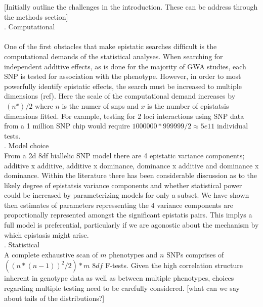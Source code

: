 \documentclass{article}
\begin{document}
[Initially outline the challenges in the introduction. These can be address through the methods section] \\
. Computational \\ 
 \\
\newline
One of the first obstacles that make epistatic searches difﬁcult is the computational demands of the statistical analyses. When searching for independent additive effects, as is done for the majority of GWA studies, each SNP is tested for association with the phenotype. However, in order to most powerfully identify epistatic effects, the search must be increased to multiple dimensions (ref). Here the scale of the computational demand increases by $~(n^x)/2$ where $n$ is the numer of snps and $x$ is the number of epistatsis dimensions fitted. For example, testing for 2 loci interactions using SNP data from a 1 million SNP chip would require $1000000 * 999999/2 \approx 5e11$ individual tests. \\     
. Model choice \\
\newline
From a 2d 8df biallelic SNP model there are 4 epistatic variance components; additive x additive, additive x
dominance, dominance x additive and dominance x dominance. Within the literature there has been considerable discussion as to the likely degree of epistatsis variance components and whether statistical power could be increased by parameterizing models for only a subset. We have shown then estimates of parameters repressenting the 4 variance components are proportionally represented amongst the significant epistatis pairs. This implys a full model is preferential, particularly if we are agonostic about the mechanism by which epistasis might arise. \\  
. Statistical \\
\newline
A complete exhaustive scan of $m$ phenotypes and $n$ SNPs comprises of $((n*(n-1))^2/2)*m$ $8df$ F-tests. Given the high correlation structure inherent in genotype data as well as between multiple phenotypes, choices regarding multiple testing need to be carefully considered. [what can we say about tails of the distributions?]
\end{document}

